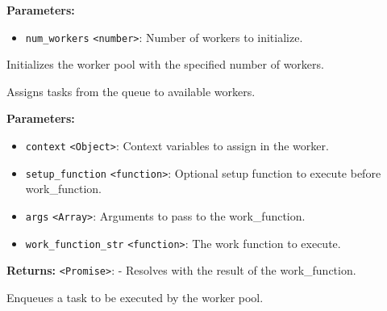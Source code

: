 \documentclass[12pt,a4paper]{article}
\begin{document}
\noindent \textbf{Parameters:}
\begin{itemize}
  \item \texttt{num\_workers} \texttt{<number>}: Number of workers to initialize.
\end{itemize}

\noindent Initializes the worker pool with the specified number of workers.

\vspace{5mm}
\noindent {}


\noindent Assigns tasks from the queue to available workers.

\vspace{5mm}
\noindent {}


\noindent \textbf{Parameters:}
\begin{itemize}
  \item \texttt{context} \texttt{<Object>}: Context variables to assign in the worker.
  \item \texttt{setup\_function} \texttt{<function>}: Optional setup function to execute before work\_function.
  \item \texttt{args} \texttt{<Array>}: Arguments to pass to the work\_function.
  \item \texttt{work\_function\_str} \texttt{<function>}: The work function to execute.
\end{itemize}

\noindent \textbf{Returns:} \texttt{<Promise>}: - Resolves with the result of the work\_function.

\noindent Enqueues a task to be executed by the worker pool.

\vspace{5mm}
\noindent {}
\end{document}

